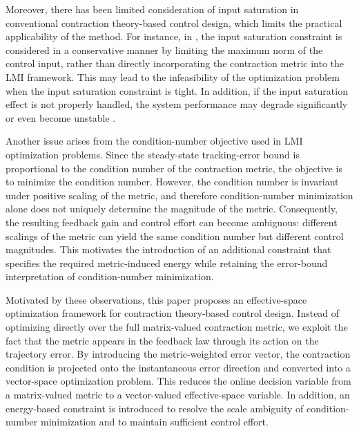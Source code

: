 \documentclass{ifacconf}
\begin{document}
Moreover, there has been limited consideration of input saturation in conventional contraction theory-based control design, which limits the practical applicability of the method.
For instance, in \cite{Tsukamoto:2019aa}, the input saturation constraint is considered in a conservative manner by limiting the maximum norm of the control input, rather than directly incorporating the contraction metric into the LMI framework.
This may lead to the infeasibility of the optimization problem when the input saturation constraint is tight.
In addition, if the input saturation effect is not properly handled, the system performance may degrade significantly or even become unstable \cite{Ryu:2025aa}.

Another issue arises from the condition-number objective used in LMI optimization problems.
Since the steady-state tracking-error bound is proportional to the condition number of the contraction metric, the objective is to minimize the condition number.
However, the condition number is invariant under positive scaling of the metric, and therefore condition-number minimization alone does not uniquely determine the magnitude of the metric.
Consequently, the resulting feedback gain and control effort can become ambiguous: different scalings of the metric can yield the same condition number but different control magnitudes.
This motivates the introduction of an additional constraint that specifies the required metric-induced energy while retaining the error-bound interpretation of condition-number minimization.


Motivated by these observations, this paper proposes an effective-space optimization framework for contraction theory-based control design.
Instead of optimizing directly over the full matrix-valued contraction metric, we exploit the fact that the metric appears in the feedback law through its action on the trajectory error.
By introducing the metric-weighted error vector, the contraction condition is projected onto the instantaneous error direction and converted into a vector-space optimization problem.
This reduces the online decision variable from a matrix-valued metric to a vector-valued effective-space variable.
In addition, an energy-based constraint is introduced to resolve the scale ambiguity of condition-number minimization and to maintain sufficient control effort.
\end{document}

